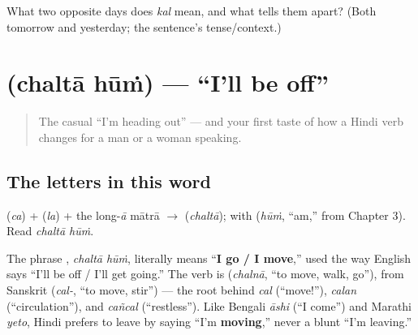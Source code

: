 \begin{tcolorbox}[breakable,colback=teal!4,colframe=teal!35!black,title={Before you move on}]
What two opposite days does \emph{kal} mean, and what tells them apart? (Both tomorrow and yesterday; the sentence's tense/context.)
\end{tcolorbox}
\section[\texorpdfstring{\hi{चलता} \hi{हूँ} / \hi{चलती} \hi{हूँ} … (chaltā hūṁ …)}{चलता हूँ / चलती हूँ … (chaltā hūṁ …)}]{  (chaltā hūṁ) — \textquotedblleft{}I'll be off\textquotedblright{}}

\label{lesson:HI-C04-chalta-hun}



\begin{quote}
The casual \textquotedblleft{}I'm heading out\textquotedblright{} — and your first taste of how a Hindi verb changes for a man or a woman speaking.
\end{quote}

\subsection*{The letters in this word}
\textbf{} (\emph{ca}) + \textbf{} (\emph{la}) + the long-\emph{ā} mātrā $\to$ \textbf{} (\emph{chaltā}); with \textbf{} (\emph{hūṁ}, \textquotedblleft{}am,\textquotedblright{} from Chapter 3). Read \emph{chaltā hūṁ}.

\begin{cousinweb}
The phrase \textbf{ }, \emph{chaltā hūṁ}, literally means \textquotedblleft{}\textbf{I go / I move},\textquotedblright{} used the way English says \textquotedblleft{}I'll be off / I'll get going.\textquotedblright{} The verb is \textbf{} (\emph{chalnā}, \textquotedblleft{}to move, walk, go\textquotedblright{}), from Sanskrit \textbf{} (\emph{cal-}, \textquotedblleft{}to move, stir\textquotedblright{}) — the root behind \emph{cal} (\textquotedblleft{}move!\textquotedblright{}), \emph{calan} (\textquotedblleft{}circulation\textquotedblright{}), and \emph{cañcal} (\textquotedblleft{}restless\textquotedblright{}). Like Bengali \emph{āshi} (\textquotedblleft{}I come\textquotedblright{}) and Marathi \emph{yeto}, Hindi prefers to leave by saying \textquotedblleft{}I'm \textbf{moving},\textquotedblright{} never a blunt \textquotedblleft{}I'm leaving.\textquotedblright{}
\end{cousinweb}

